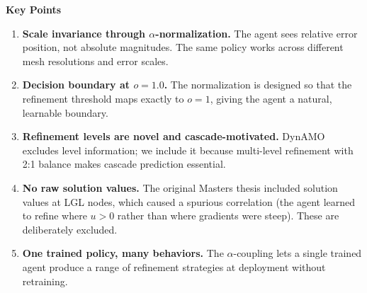 \documentclass[11pt]{article}
\begin{document}
\vspace{0.5cm}
\noindent\textbf{Key Points}

\begin{enumerate}[leftmargin=1.5em, itemsep=4pt]
    \item \textbf{Scale invariance through $\alpha$-normalization.} The agent sees relative error position, not absolute magnitudes. The same policy works across different mesh resolutions and error scales.
    \item \textbf{Decision boundary at $o = 1.0$.} The normalization is designed so that the refinement threshold maps exactly to $o = 1$, giving the agent a natural, learnable boundary.
    \item \textbf{Refinement levels are novel and cascade-motivated.} DynAMO excludes level information; we include it because multi-level refinement with 2:1 balance makes cascade prediction essential.
    \item \textbf{No raw solution values.} The original Masters thesis included solution values at LGL nodes, which caused a spurious correlation (the agent learned to refine where $u > 0$ rather than where gradients were steep). These are deliberately excluded.
    \item \textbf{One trained policy, many behaviors.} The $\alpha$-coupling lets a single trained agent produce a range of refinement strategies at deployment without retraining.
\end{enumerate}
\end{document}
